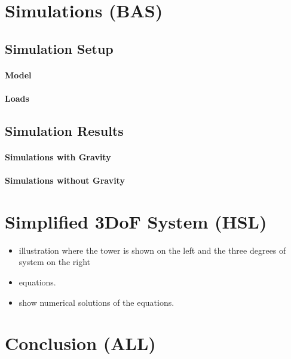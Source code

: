 \documentclass{article}
\begin{document}
\clearpage

\section{Simulations (BAS)}
\label{sec:simulations}

\subsection{Simulation Setup}

\paragraph{Model}

\paragraph{Loads}

\subsection{Simulation Results}

\paragraph{Simulations with Gravity}

\paragraph{Simulations without Gravity}

\clearpage

\section{Simplified 3DoF System (HSL)}
\label{sec:3dof}

\begin{itemize}
    \item illustration where the tower is shown on the left and the three degrees of system on the right
    \item equations.
    \item show numerical solutions of the equations.
\end{itemize}

\clearpage

\section{Conclusion (ALL)}
\label{sec:experiment}
\end{document}
